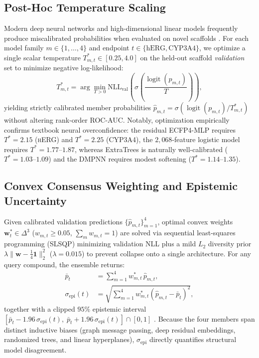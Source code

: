 \documentclass[10pt,twocolumn,letterpaper]{article}
\newcommand{\sige}{\sigma_{\mathrm{epi}}}
\begin{document}
\subsection{Post-Hoc Temperature Scaling}
Modern deep neural networks and high-dimensional linear models frequently produce miscalibrated probabilities when evaluated on novel scaffolds \citep{guo2017calibration}. For each model family $m \in \{1,\dots,4\}$ and endpoint $t \in \{\mathrm{hERG}, \mathrm{CYP3A4}\}$, we optimize a single scalar temperature $T_{m,t}^* \in [0.25, 4.0]$ on the held-out scaffold \emph{validation} set to minimize negative log-likelihood:
\begin{equation}
  T_{m,t}^* = \arg\min_{T > 0} \mathrm{NLL}_{\mathrm{val}}\!\left(\sigma\!\left(\frac{\operatorname{logit}(p_{m,t})}{T}\right)\right),
\end{equation}
yielding strictly calibrated member probabilities $\hat{p}_{m,t} = \sigma(\operatorname{logit}(p_{m,t}) / T_{m,t}^*)$ without altering rank-order \textsc{ROC-AUC}. Notably, optimization empirically confirms textbook neural overconfidence: the residual \textsc{ECFP4-MLP} requires $T^* = 2.15$ (\textsc{hERG}) and $T^* = 2.25$ (\textsc{CYP3A4}), the $2{,}068$-feature logistic model requires $T^* = 1.77$–$1.87$, whereas ExtraTrees is naturally well-calibrated ($T^* = 1.03$–$1.09$) and the \textsc{DMPNN} requires modest softening ($T^* = 1.14$–$1.35$).

\subsection{Convex Consensus Weighting and Epistemic Uncertainty}
Given calibrated validation predictions $\{\hat{p}_{m,t}\}_{m=1}^4$, optimal convex weights $\mathbf{w}_t^* \in \Delta^3$ ($w_{m,t} \ge 0.05$, $\sum_m w_{m,t} = 1$) are solved via sequential least-squares programming (\textsc{SLSQP}) minimizing validation \textsc{NLL} plus a mild $L_2$ diversity prior $\lambda \|\mathbf{w} - \tfrac{1}{4}\mathbf{1}\|_2^2$ ($\lambda = 0.015$) to prevent collapse onto a single architecture. For any query compound, the ensemble returns:
\begin{align}
  \bar{p}_t &= \sum_{m=1}^{4} w_{m,t}^* \,\hat{p}_{m,t}, \label{eq:ens_mean} \\
  \sige(t) &= \sqrt{\sum_{m=1}^{4} w_{m,t}^* \left(\hat{p}_{m,t} - \bar{p}_t\right)^2}, \label{eq:ens_std}
\end{align}
together with a clipped $95\%$ epistemic interval $[\bar{p}_t - 1.96\,\sige(t),\; \bar{p}_t + 1.96\,\sige(t)] \cap [0,1]$ \citep{lakshminarayanan2017simple}. Because the four members span distinct inductive biases (graph message passing, deep residual embeddings, randomized trees, and linear hyperplanes), $\sige$ directly quantifies structural model disagreement.
\end{document}
